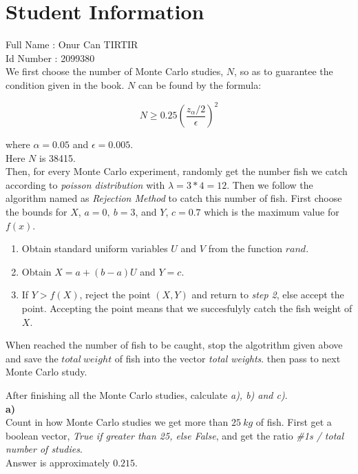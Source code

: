 \documentclass[12pt]{article}
\begin{document}
\section*{Student Information } 
Full Name :  Onur Can TIRTIR\\
Id Number :  2099380\\

We first choose the number of Monte Carlo studies, $N$, so as to guarantee the condition given in the book. $N$ can be found by the formula:

$$ N \geq 0.25 (\dfrac{z_\alpha / 2}{\epsilon})^2$$

where $\alpha = 0.05$ and $\epsilon = 0.005$.\\

Here $N$ is 38415.\\

Then, for every Monte Carlo experiment, randomly get the number fish we catch according to \textit{poisson distribution} with $\lambda=3*4=12$. Then we follow the algorithm named as \textit{Rejection Method} to catch this number of fish. First choose the bounds for $X$, $a=0,\ b=3$, and $Y$, $c=0.7$ which is the maximum value for $f(x)$.

\begin{enumerate}
	\item Obtain standard uniform variables $U$ and $V$ from the function $rand$.
	\item Obtain $X = a + (b-a)U$ and $Y = c$.
	\item If $Y > f(X)$, reject the point $(X,Y)$ and return to \textit{step 2}, else accept the point. Accepting the point means that we succesfulyly catch the fish weight of $X$.
\end{enumerate}

When reached the number of fish to be caught, stop the algotrithm given above and save the $total\ weight$ of fish into the vector \textit{total weights}. then pass to next Monte Carlo study.

After finishing all the Monte Carlo studies, calculate \textit{a), b) and c)}. \\

\textbf{a)}\\
Count in how Monte Carlo studies we get more than $25\ kg$ of fish. First get a boolean vector, \textit{True if greater than 25, else False}, and get the ratio \textit{\#1s / total number of studies}.\\

Answer is approximately $0.215$.\\
\end{document}
